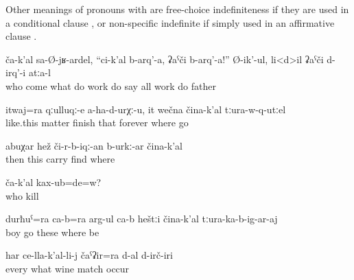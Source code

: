 Other meanings of pronouns with  are free-choice indefiniteness if they are used in a conditional clause ,  or non-specific indefinite if simply used in an affirmative clause .
%
\begin{exe}
	\ex	\label{ex:Whoever came saying, do something, do this work, father did all works}
	\gll	ča-k'al	sa-Ø-jʁ-ardel,		``ci-k'al	b-arq'-a,	ʡaˁči	b-arq'-a!''	Ø-ik'-ul,	li<d>il	ʡaˁči	d-irq'-i	atːa-l\\
		who	come		what	do		work	do	say	all	work	do	father\\
	\glt	{}

	\ex	\label{ex:And like this also (Isakadi’s) issues, things do not finish, forever, wherever he went}
	\gll	itwaj=ra	qːulluqː-e	a-ha-d-urχː-u,	it	wečna	čina-k'al	tːura-w-q-utːel\\
		like.this	matter	finish	that	forever	where	go\\
	\glt	{}

	\ex	\label{ex:Then this needs to be positioned somewhere (else) probably}
	\gll	abuχar	hež	či-r-b-iqː-an	b-urkː-ar	čina-k'al\\
		then	this	carry	find	where\\
	\glt	{}

	\ex	\label{ex:Did you kill anyone}
	\gll	ča-k'al	kax-ub=de=w?\\
		who	kill\\
	\glt	{}

	\ex	\label{ex:And together with the son they are going to sit outside anywhere}
	\gll	durħuˁ=ra	ca-b=ra	arg-ul ca-b	heštːi	čina-k'al	tːura-ka-b-ig-ar-aj\\
		boy		go 	these	where	be\\
	\glt	{}

	\ex	\label{ex:Wine fit well with any of these (types of food)}
	\gll	har	ce-lla-k'al-li-j	čaˁʡir=ra	d-al d-irč-iri\\
		every	what	wine	\tsc{npl-}match occur\\
	\glt	{}
\end{exe}

